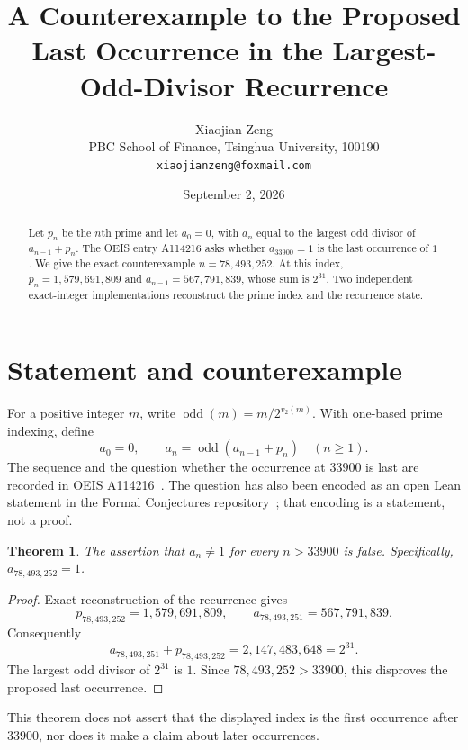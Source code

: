 \documentclass[11pt]{article}
\title{A Counterexample to the Proposed Last Occurrence in the Largest-Odd-Divisor Recurrence}
\author{Xiaojian Zeng\\PBC School of Finance, Tsinghua University, 100190\\\texttt{xiaojianzeng@foxmail.com}}
\date{September 2, 2026}
\newtheorem{theorem}{Theorem}
\begin{document}
\maketitle
\begin{abstract}
Let $p_n$ be the $n$th prime and let $a_0=0$, with $a_n$ equal to the largest odd divisor of $a_{n-1}+p_n$. The OEIS entry A114216 asks whether $a_{33900}=1$ is the last occurrence of $1$. We give the exact counterexample $n=78{,}493{,}252$. At this index, $p_n=1{,}579{,}691{,}809$ and $a_{n-1}=567{,}791{,}839$, whose sum is $2^{31}$. Two independent exact-integer implementations reconstruct the prime index and the recurrence state.
\end{abstract}
\section{Statement and counterexample}
For a positive integer $m$, write $\operatorname{odd}(m)=m/2^{v_2(m)}$. With one-based prime indexing, define
\[
 a_0=0,\qquad a_n=\operatorname{odd}(a_{n-1}+p_n)\quad(n\geq1).
\]
The sequence and the question whether the occurrence at $33900$ is last are recorded in OEIS A114216~\cite{oeis114216}. The question has also been encoded as an open Lean statement in the Formal Conjectures repository~\cite{formalconjectures114216}; that encoding is a statement, not a proof.
\begin{theorem}
The assertion that $a_n\ne1$ for every $n>33900$ is false. Specifically, $a_{78{,}493{,}252}=1$.
\end{theorem}
\begin{proof}
Exact reconstruction of the recurrence gives
\[
 p_{78{,}493{,}252}=1{,}579{,}691{,}809,\qquad
 a_{78{,}493{,}251}=567{,}791{,}839.
\]
Consequently
\[
 a_{78{,}493{,}251}+p_{78{,}493{,}252}=2{,}147{,}483{,}648=2^{31}.
\]
The largest odd divisor of $2^{31}$ is $1$. Since $78{,}493{,}252>33900$, this disproves the proposed last occurrence.
\end{proof}
This theorem does not assert that the displayed index is the first occurrence after $33900$, nor does it make a claim about later occurrences.
\end{document}
